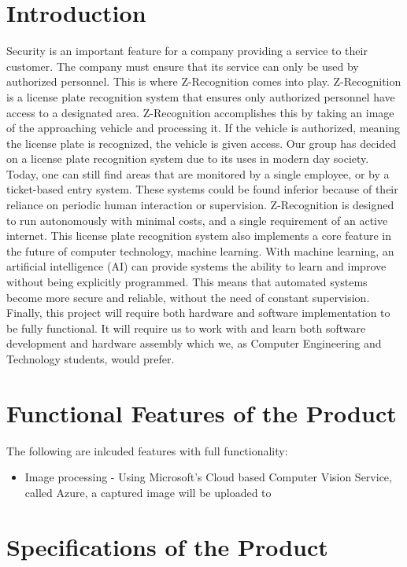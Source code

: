 \documentclass[a4paper,12pt]{article}
\begin{document}
\section{Introduction}
Security is an important feature for a company providing a service to their customer. The company must ensure that its service can only be used by authorized personnel. This is where Z-Recognition comes into play. Z-Recognition is a license plate recognition system that ensures only authorized personnel have access to a designated area. Z-Recognition accomplishes this by taking an image of the approaching vehicle and processing it. If the vehicle is authorized, meaning the license plate is recognized, the vehicle is given access. Our group has decided on a license plate recognition system due to its uses in modern day society. Today, one can still find areas that are monitored by a single employee, or by a ticket-based entry system. These systems could be found inferior because of their reliance on periodic human interaction or supervision. Z-Recognition is designed to run autonomously with minimal costs, and a single requirement of an active internet. This license plate recognition system also implements a core feature in the future of computer technology, machine learning. With machine learning, an artificial intelligence (AI) can provide systems the ability to learn and improve without being explicitly programmed. This means that automated systems become more secure and reliable, without the need of constant supervision. Finally, this project will require both hardware and software implementation to be fully functional. It will require us to work with and learn both software development and hardware assembly which we, as Computer Engineering and Technology students, would prefer.

\newpage
\section{Functional Features of the Product}
The following are inlcuded features with full functionality:
\begin{itemize}
    \item Image processing - Using Microsoft's Cloud based Computer Vision Service, called Azure, a captured image will be uploaded to 
\end{itemize}

\newpage
\section{Specifications of the Product}
\end{document}
